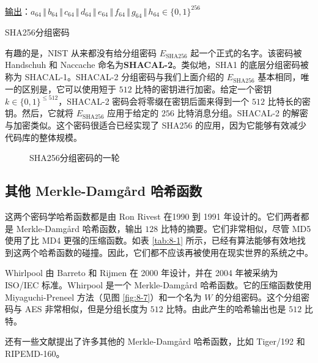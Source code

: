 \begin{snote}
\begin{table}
\vspace{15pt}

\hspace*{5pt} \underline{输出}：$a_{64}\,\Vert\,b_{64}\,\Vert\,c_{64}\,\Vert\,d_{64}\,\Vert\,e_{64}\,\Vert\,f_{64}\,\Vert\,g_{64}\,\Vert\,h_{64}\in\{0,1\}^{256}$

\caption{SHA256分组密码}
\label{tab:8-3}
\end{table}

有趣的是，NIST 从来都没有给分组密码 $E_\mathrm{SHA256}$ 起一个正式的名字。该密码被 Handschuh 和 Naccache 命名为\textbf{SHACAL-2}。类似地，SHA1 的底层分组密码被称为 SHACAL-1。SHACAL-2 分组密码与我们上面介绍的 $E_\mathrm{SHA256}$ 基本相同，唯一的区别是，它可以使用短于 $512$ 比特的密钥进行加密。给定一个密钥 $k\in\{0,1\}^{\leq512}$，SHACAL-2 密码会将零缀在密钥后面来得到一个 $512$ 比特长的密钥。然后，它就将 $E_\mathrm{SHA256}$ 应用于给定的 $256$ 比特消息分组。SHACAL-2 的解密与加密类似。这个密码很适合已经实现了 SHA256 的应用，因为它能够有效减少代码库的整体规模。
\end{snote}

\begin{figure}
	\centering
	
	\caption{SHA256分组密码的一轮}
	\label{fig:8-8}
\end{figure}
 
\subsection{其他 Merkle-Damg{\aa}rd 哈希函数}\label{subsec:8-6-1}

\begin{snote}[MD4和MD5。]
这两个密码学哈希函数都是由 Ron Rivest 在1990 到 1991 年设计的。它们两者都是 Merkle-Damg{\aa}rd 哈希函数，输出 $128$ 比特的摘要。它们非常相似，尽管 MD5 使用了比 MD4 更强的压缩函数。如表 \ref{tab:8-1} 所示，已经有算法能够有效地找到这两个哈希函数的碰撞。因此，它们都不应该再被使用在现实世界的系统之中。
\end{snote}

\begin{snote}[Whirpool。]
Whirlpool 由 Barreto 和 Rijmen 在 2000 年设计，并在 2004 年被采纳为 ISO/IEC 标准。Whirpool 是一个 Merkle-Damg{\aa}rd 哈希函数。它的压缩函数使用 Miyaguchi-Preneel 方法（见图 \ref{fig:8-7}）和一个名为 $W$ 的分组密码。这个分组密码与 AES 非常相似，但是分组长度为 $512$ 比特。由此产生的哈希输出也是 $512$ 比特。
\end{snote}

\begin{snote}[其他算法。]
还有一些文献提出了许多其他的 Merkle-Damg{\aa}rd 哈希函数，比如 Tiger/192 和 RIPEMD-160。
\end{snote}